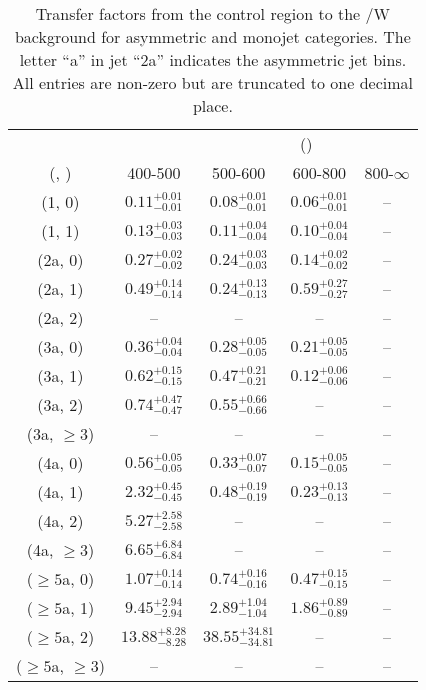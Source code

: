 \begin{table}[h!]
\tiny
\centering
\caption{Transfer factors from the \gj control region to the \ttbar/W background for asymmetric and monojet categories. The letter ``a'' in jet \eg ``2a''  indicates the asymmetric jet bins. All entries are non-zero but are truncated to one decimal place.\label{tab:tf_gj_ttw_asym}}
\begin{tabular}
{ccccc}
	\hline\hline
&	& \multicolumn{4}{c}{\scalht (\gev)} \\ 
	 (\njet,  \nb) & 400-500 & 500-600 & 600-800 & 800-$\infty$ \\ [0.8ex] 
\hline
	(1, 0) & $0.11^{+ 0.01 }_{- 0.01 }$ & $0.08^{+ 0.01 }_{- 0.01 }$ & $0.06^{+ 0.01 }_{- 0.01 }$ & -- \\[0.5ex] 
	(1, 1) & $0.13^{+ 0.03 }_{- 0.03 }$ & $0.11^{+ 0.04 }_{- 0.04 }$ & $0.10^{+ 0.04 }_{- 0.04 }$ & -- \\[0.5ex] 
	(2a, 0) & $0.27^{+ 0.02 }_{- 0.02 }$ & $0.24^{+ 0.03 }_{- 0.03 }$ & $0.14^{+ 0.02 }_{- 0.02 }$ & -- \\[0.5ex] 
	(2a, 1) & $0.49^{+ 0.14 }_{- 0.14 }$ & $0.24^{+ 0.13 }_{- 0.13 }$ & $0.59^{+ 0.27 }_{- 0.27 }$ & -- \\[0.5ex] 
	(2a, 2) & -- & -- & -- & -- \\[0.5ex] 
	(3a, 0) & $0.36^{+ 0.04 }_{- 0.04 }$ & $0.28^{+ 0.05 }_{- 0.05 }$ & $0.21^{+ 0.05 }_{- 0.05 }$ & -- \\[0.5ex] 
	(3a, 1) & $0.62^{+ 0.15 }_{- 0.15 }$ & $0.47^{+ 0.21 }_{- 0.21 }$ & $0.12^{+ 0.06 }_{- 0.06 }$ & -- \\[0.5ex] 
	(3a, 2) & $0.74^{+ 0.47 }_{- 0.47 }$ & $0.55^{+ 0.66 }_{- 0.66 }$ & -- & -- \\[0.5ex] 
	(3a, $\ge3$) & -- & -- & -- & -- \\[0.5ex] 
	(4a, 0) & $0.56^{+ 0.05 }_{- 0.05 }$ & $0.33^{+ 0.07 }_{- 0.07 }$ & $0.15^{+ 0.05 }_{- 0.05 }$ & -- \\[0.5ex] 
	(4a, 1) & $2.32^{+ 0.45 }_{- 0.45 }$ & $0.48^{+ 0.19 }_{- 0.19 }$ & $0.23^{+ 0.13 }_{- 0.13 }$ & -- \\[0.5ex] 
	(4a, 2) & $5.27^{+ 2.58 }_{- 2.58 }$ & -- & -- & -- \\[0.5ex] 
	(4a, $\ge3$) & $6.65^{+ 6.84 }_{- 6.84 }$ & -- & -- & -- \\[0.5ex] 
	($\ge5$a, 0) & $1.07^{+ 0.14 }_{- 0.14 }$ & $0.74^{+ 0.16 }_{- 0.16 }$ & $0.47^{+ 0.15 }_{- 0.15 }$ & -- \\[0.5ex] 
	($\ge5$a, 1) & $9.45^{+ 2.94 }_{- 2.94 }$ & $2.89^{+ 1.04 }_{- 1.04 }$ & $1.86^{+ 0.89 }_{- 0.89 }$ & -- \\[0.5ex] 
	($\ge5$a, 2) & $13.88^{+ 8.28 }_{- 8.28 }$ & $38.55^{+ 34.81 }_{- 34.81 }$ & -- & -- \\[0.5ex] 
	($\ge5$a, $\ge3$) & -- & -- & -- & -- \\[0.5ex] 
	\hline
	\hline
\end{tabular}
\end{table}
